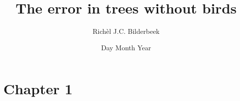 \documentclass[12pt]{report}
\title{The error in trees without birds}
\author{Rich\`el J.C. Bilderbeek}
\date{Day Month Year}
\begin{document}
\maketitle

\section{Chapter 1}
\end{document}
